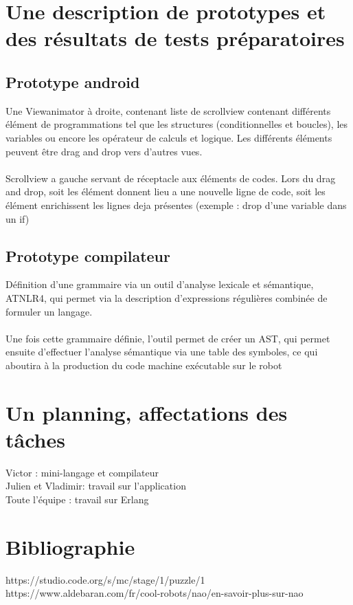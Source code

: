 \documentclass[a4paper]{article}
\begin{document}
\section{Une description de prototypes et des résultats de tests préparatoires}
\subsection{Prototype android}
Une Viewanimator à droite, contenant liste de scrollview contenant différents élément de programmations tel que les structures (conditionnelles et boucles), les variables ou encore les opérateur de calculs et logique. Les différents éléments peuvent être drag and drop vers d’autres vues. \\
\\
Scrollview a gauche servant de réceptacle aux éléments de codes. Lors du drag and drop, soit les élément donnent lieu a une nouvelle ligne de code, soit les élément enrichissent les lignes deja présentes (exemple : drop d’une variable dans un if)
\subsection{Prototype compilateur}
Définition d’une grammaire via un outil d’analyse lexicale et sémantique, ATNLR4, qui permet via la description d’expressions régulières combinée de formuler un langage.\\
\\
Une fois cette grammaire définie, l’outil permet de créer un AST, qui permet ensuite d’effectuer l’analyse sémantique via une table des symboles, ce qui aboutira à la production du code machine exécutable sur le robot
\section{Un planning, affectations des tâches}
Victor : mini-langage et compilateur\\
Julien et Vladimir: travail sur l’application\\
Toute l’équipe : travail sur Erlang\\
\section*{Bibliographie}
https://studio.code.org/s/mc/stage/1/puzzle/1\\
https://www.aldebaran.com/fr/cool-robots/nao/en-savoir-plus-sur-nao\\
\end{document}
